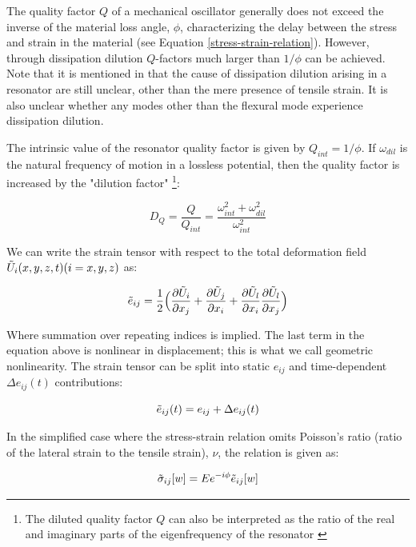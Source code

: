 \documentclass[%
 reprint,
nofootinbib,
 amsmath,amssymb,
 aps,
]{revtex4-2}
\begin{document}
The quality factor $Q$ of a mechanical oscillator generally does not exceed the inverse of the material loss angle, $\phi$, characterizing the delay between the stress and strain in the material (see Equation \ref{stress-strain-relation}). However, through dissipation dilution $Q$-factors much larger than $1/\phi$ can be achieved. Note that it is mentioned in \cite{generalized_dissipation_dilution} that the cause of dissipation dilution arising in a resonator are still unclear, other than the mere presence of tensile strain. It is also unclear whether any modes other than the flexural mode experience dissipation dilution. 
\newline

The intrinsic value of the resonator quality factor is given by $Q_{int} = 1/\phi$. If $\omega_{dil}$ is the natural frequency of motion in a lossless potential, then the quality factor is increased by the "dilution factor" \footnote{The diluted quality factor $Q$ can also be interpreted as the ratio of the real and imaginary parts of the eigenfrequency of the resonator \cite{ghadimi_thesis}}:

\begin{equation}\label{D_Q}
    D_Q = \frac{Q}{Q_{int}} = \frac{\omega_{int}^2 + \omega_{dil}^2}{\omega_{int}^2}
\end{equation}  

We can write the strain tensor with respect to the total deformation field $\Tilde{U}_{i}(x, y, z, t) (i = x, y, z)$ as:

\begin{equation}\label{strain tensor}
    \Tilde{e}_{ij} = \frac{1}{2} \Big ( \frac{\partial \Tilde{U}_i}{\partial x_j} + \frac{\partial \Tilde{U}_j}{\partial x_i} + \frac{\partial \Tilde{U}_l}{\partial x_i}\frac{\partial \Tilde{U}_l}{\partial x_j} \Big )
\end{equation}

Where summation over repeating indices is implied. The last term in the equation above is nonlinear in displacement; this is what we call geometric nonlinearity. The strain tensor can be split into static $e_{ij}$ and time-dependent $\Delta e_{ij}(t)$ contributions:

$$ \Tilde{e}_{ij}(t) = e_{ij} + \Delta e_{ij}(t) $$

In the simplified case where the stress-strain relation omits Poisson's ratio (ratio of the lateral strain to the tensile strain), $\nu$, the relation is given as:

\begin{equation}\label{stress-strain-relation}
     \Tilde{\sigma}_{ij}[w] = E e^{-i\phi} \Tilde{e}_{ij}[w] 
\end{equation}
\end{document}
